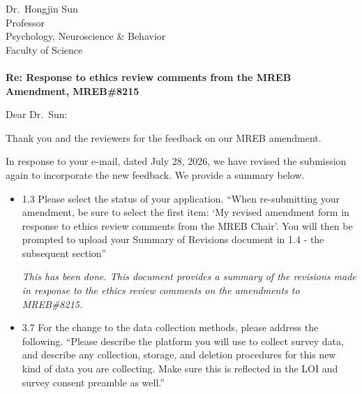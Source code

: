 \documentclass[12pt]{casletter}
\begin{document}
\begin{letter}{~\\
    ~\\
    ~\\
    ~\\
    ~\\
    Dr.\ Hongjin Sun\\
    Professor\\
    Psychology, Neuroscience \& Behavior\\
    Faculty of Science\\
    ~\\
    {\bf Re: Response to ethics review comments from the MREB Amendment, MREB\#8215}}

\opening {Dear Dr.\ Sun:}

  Thank you and the reviewers for the feedback on our MREB amendment.    
  
  In response to your e-mail, dated July 28, 2026, we have revised the
  submission again to incorporate the new feedback.  We provide a summary below.


\begin{itemize}
  
\item 1.3 Please select the status of your application. ``When re-submitting
your amendment, be sure to select the first item: `My revised amendment form in
response to ethics review comments from the MREB Chair'. You will then be
prompted to upload your Summary of Revisions document in 1.4 - the subsequent
section''\medskip

\emph{This has been done.  This document provides a summary of the revisions
made in response to the ethics review comments on the amendments to MREB\#8215.} \smallskip

\item 3.7 For the change to the data collection methods, please address the
following.  ``Please describe the platform you will use to collect survey data,
and describe any collection, storage, and deletion procedures for this new kind
of data you are collecting. Make sure this is reflected in the LOI and survey
consent preamble as well.'' \medskip


\end{itemize}
\end{letter}
\end{document}
